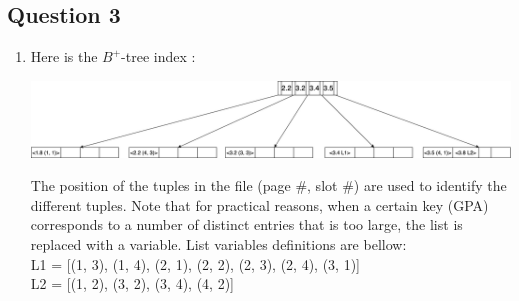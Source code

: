 \newpage
\subsection*{Question 3}

\begin{enumerate}[label={(\alph*)}]
    \item Here is the $B^+$-tree index :
    
        \begin{center}
            \includegraphics[width=1\textwidth]{img/img3.png}
        \end{center}
    
    \noindent The position of the tuples in the file (page \#, slot \#) are used to identify the different tuples. Note that for practical reasons, when a certain key (GPA) corresponds to a number of distinct entries that is too large, the list is replaced with a variable. List variables definitions are bellow: \\
    L1 = [(1, 3), (1, 4), (2, 1), (2, 2), (2, 3), (2, 4), (3, 1)]\\
    L2 = [(1, 2), (3, 2), (3, 4), (4, 2)]
    

\end{enumerate}
